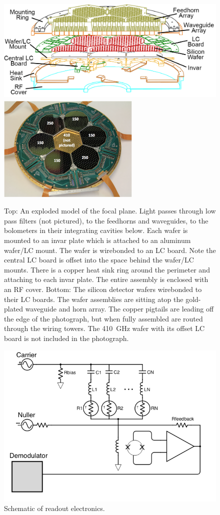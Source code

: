 \begin{figure}[htbp]
\begin{center}
\includegraphics[height=2.0in]{figures/focal_plane_outline_central_labeled.png}
\includegraphics[height=2.0in]{figures/focal_plane_photo.png}
\caption[EBEX focal plane]{Top: An exploded model of the focal plane. Light passes through low pass filters (not pictured), to the feedhorns and waveguides, to the bolometers in their integrating cavities below. Each wafer is mounted to an invar plate which is attached to an aluminum wafer/\ac{LC} mount. The wafer is wirebonded to an \ac{LC} board. Note the central \ac{LC} board is offset into the space behind the wafer/\ac{LC} mounts. There is a copper heat sink ring around the perimeter and attaching to each invar plate. The entire assembly is enclosed with an RF cover. Bottom: The silicon detector wafers wirebonded to their \ac{LC} boards. The wafer assemblies are sitting atop the gold-plated waveguide and horn array. The copper pigtails are leading off the edge of the photograph, but when fully assembled are routed through the wiring towers. The 410~GHz wafer with its offset \ac{LC} board is not included in the photograph. 
\label{fig:focal_plane} }
\end{center}
\end{figure}


\begin{figure}[htbp]
\begin{center}
\includegraphics[width=0.6\columnwidth]{figures/dfmux_schematic.png}
\caption[DFMUX schematic]{Schematic of readout electronics. 
\label{fig:dfmux} }
\end{center}
\end{figure}


